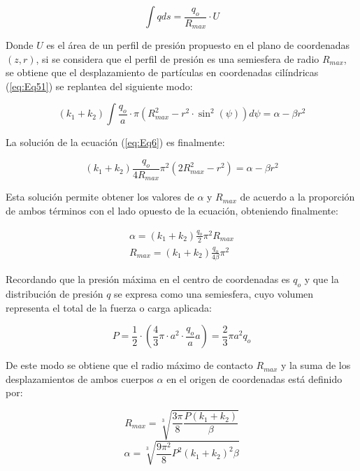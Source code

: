 \documentclass[main]{subfiles}
\begin{document}
\begin{equation}
\label{eq:SolvInt}
\int qds=\frac{q_o}{R_{max}}\cdot U
\end{equation}

Donde $U$ es el área de un perfil de presión propuesto en el plano de coordenadas $(z,r)$, si se considera que el perfil de presión es una semiesfera de radio $R_{max}$, se obtiene que el desplazamiento de partículas en coordenadas cilíndricas (\ref{eq:Eq51}) se replantea del siguiente modo:

 
   \begin{equation}
  \label{eq:Eq6}
    \left(
  k_1+k_2
  \right)
  \int \frac{q_o}{a}\cdot \pi(R_{max}^2-r^2\cdot \sin ^2(\psi)) d\psi =\alpha-\beta r^2
  \end{equation}
 
 La solución de la ecuación (\ref{eq:Eq6}) es finalmente:
 
  \begin{equation}
  \label{eq:Eq7}
    \left(
  k_1+k_2
  \right) \frac{q_o}{4R_{max}}
  \pi^2(2R_{max}^2-r^2)=\alpha-\beta r^2
  \end{equation}

Esta solución permite obtener los valores de $\alpha$ y $R_{max}$ de acuerdo a la proporción de ambos términos con el lado opuesto de la ecuación, obteniendo finalmente:

\begin{eqnarray}
\alpha=\left(
  k_1+k_2
  \right) \frac{q_o}{2}
  \pi^2 R_{max}
  \\
  R_{max}=\left(
  k_1+k_2
  \right) \frac{q_o}{4\beta}
  \pi^2
\end{eqnarray}

Recordando que la presión máxima en el centro de coordenadas es $q_o$ y que la distribución de presión $q$ se expresa como una semiesfera, cuyo volumen representa el total de la fuerza o carga aplicada:

\begin{equation}
\label{load}
P=\frac{1}{2}\cdot\left(\frac{4}{3}\pi\cdot a^2 \cdot \frac{q_o}{a}a\right)=\frac{2}{3}\pi a^2  q_o
\end{equation}

De este modo se obtiene que el radio máximo de contacto $R_{max}$ y la suma de los desplazamientos de ambos cuerpos $\alpha$ en el origen de coordenadas está definido por:

\begin{equation}
\label{eq:diamMax}
R_{max}=\sqrt[3]{\frac{3\pi}{8}\frac{P(k_1+k_2)}{\beta}}
\end{equation}
\begin{equation}
\label{eq:alphaMax}
\alpha=\sqrt[3]{\frac{9\pi^2}{8}P^2(k_1+k_2)^2\beta}
\end{equation}
\end{document}
